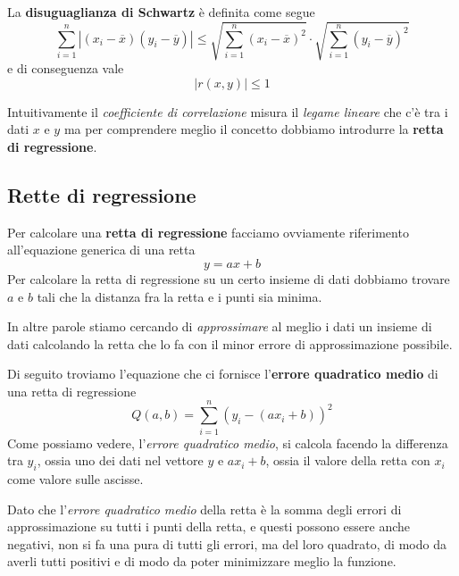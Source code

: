 \begin{definition}
	La \textbf{disuguaglianza di Schwartz} è definita come segue
	\[
		\sum_{i=1}^n |(x_i - \overline{x}) (y_i - \overline{y})| \leq
		\sqrt{\sum_{i=1}^n (x_i - \overline{x})^2} \cdot \sqrt{\sum_{i=1}^n (y_i - \overline{y})^2}
	\]
	e di conseguenza vale \[ |r(x, y)| \leq 1 \]
\end{definition}

Intuitivamente il \emph{coefficiente di correlazione} misura il \emph{legame lineare} che c'è tra i dati $x$ e $y$
ma per comprendere meglio il concetto dobbiamo introdurre la \textbf{retta di regressione}.

\subsection{Rette di regressione}
Per calcolare una \textbf{retta di regressione} facciamo ovviamente riferimento all'equazione generica di una retta
\[ y = a x + b \]
Per calcolare la retta di regressione su un certo insieme di dati dobbiamo trovare $a$ e $b$ tali che la distanza
fra la retta e i punti sia minima.

In altre parole stiamo cercando di \emph{approssimare} al meglio i dati un insieme di dati calcolando la retta che
lo fa con il minor errore di approssimazione possibile.

Di seguito troviamo l'equazione che ci fornisce l'\textbf{errore quadratico medio} di una retta di regressione
\[ Q(a, b) = \sum_{i=1}^n (y_i - (a x_i + b))^2 \]
Come possiamo vedere, l'\emph{errore quadratico medio}, si calcola facendo la differenza tra $y_i$, ossia uno dei
dati nel vettore $y$ e $a x_i + b$, ossia il valore della retta con $x_i$ come valore sulle ascisse.

Dato che l'\emph{errore quadratico medio} della retta è la somma degli errori di approssimazione su tutti i punti
della retta, e questi possono essere anche negativi, non si fa una pura di tutti gli errori, ma del loro quadrato,
di modo da averli tutti positivi e di modo da poter minimizzare meglio la funzione.


